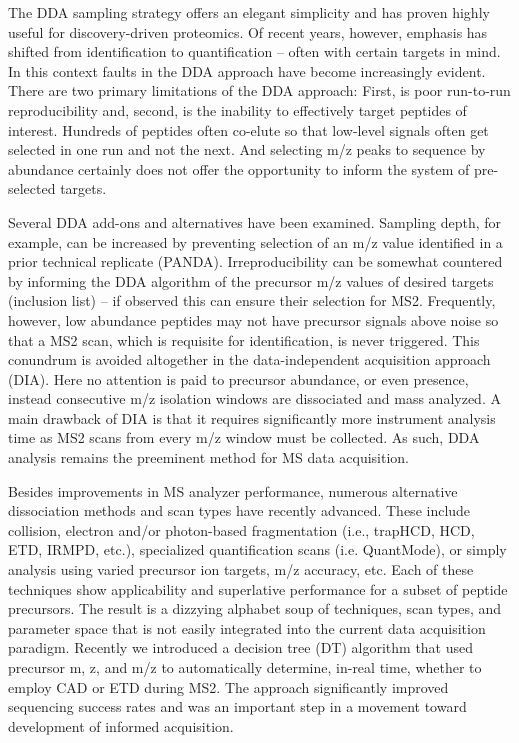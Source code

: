 The DDA sampling strategy offers an elegant simplicity and has proven highly useful for discovery-driven proteomics. Of recent years, however, emphasis has shifted from identification to quantification -- often with certain targets in mind. In this context faults in the DDA approach have become increasingly evident. There are two primary limitations of the DDA approach: First, is poor run-to-run reproducibility and, second, is the inability to effectively target peptides of interest.\cite{randomsampling} Hundreds of peptides often co-elute so that low-level signals often get selected in one run and not the next. And selecting m/z peaks to sequence by abundance certainly does not offer the opportunity to inform the system of pre-selected targets.

Several DDA add-ons and alternatives have been examined. Sampling depth, for example, can be increased by preventing selection of an m/z value identified in a prior technical replicate (PANDA).\cite{panda} Irreproducibility can be somewhat countered by informing the DDA algorithm of the precursor m/z values of desired targets (inclusion list) -- if observed this can ensure their selection for MS2. Frequently, however, low abundance peptides may not have precursor signals above noise so that a MS2 scan, which is requisite for identification, is never triggered. This conundrum is avoided altogether in the data-independent acquisition approach (DIA).\cite{dia} Here no attention is paid to precursor abundance, or even presence, instead consecutive m/z isolation windows are dissociated and mass analyzed. A main drawback of DIA is that it requires significantly more instrument analysis time as MS2 scans from every m/z window must be collected.\cite{ocean} As such, DDA analysis remains the preeminent method for MS data acquisition.

Besides improvements in MS analyzer performance, numerous alternative dissociation methods and scan types have recently advanced. These include collision, electron and/or photon-based fragmentation (i.e., trapHCD, HCD, ETD, IRMPD, etc.), specialized quantification scans (i.e. QuantMode), or simply analysis using varied precursor ion targets, m/z accuracy, etc.\cite{traphcd,hcd,etd,irmpd,quantmode,twostage} Each of these techniques show applicability and superlative performance for a subset of peptide precursors. The result is a dizzying alphabet soup of techniques, scan types, and parameter space that is not easily integrated into the current data acquisition paradigm. Recently we introduced a decision tree (DT) algorithm that used precursor m, z, and m/z to automatically determine, in-real time, whether to employ CAD or ETD during MS2.\cite{dtree} The approach significantly improved sequencing success rates and was an important step in a movement toward development of informed acquisition.

